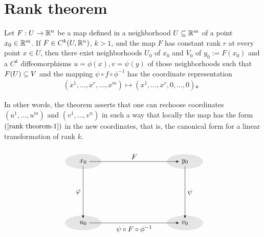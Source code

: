 \section{Rank theorem}
\begin{theorem}\label{rank theorem}
Let $F:U\to\mathbb{R}^n$ be a map defined in a neighborhood $U\subseteq\mathbb{R}^m$ of a point $x_0\in\mathbb{R}^m$. If $F\in C^k(U,\mathbb{R}^n)$, $k>1$, and the map $F$ has constant rank $r$ at every point $x\in U$, then there exist neighborhoods $U_0$ of $x_0$ and $V_0$ of $y_0:=F(x_0)$ and a $C^k$ diffeomorphisms $u=\phi(x),v=\psi(y)$ of those neighborhoods such that $F(U)\subseteq V$ and the mapping $\psi\circ f\circ\phi^{-1}$ has the coordinate representation
\begin{align}\label{rank theorem-1}
(x^1,\dots,x^r,\dots,x^m)\mapsto(x^1,\dots,x^r,0,\dots,0)。
\end{align}
\end{theorem}
In other words, the theorem asserts that one can rechoose coordinates $(u^1,\dots,u^m)$ and $(v^1,\dots,v^n)$ in such a way that locally the map has the form $(\ref{rank theorem-1})$ in the new coordinates, that is, the canonical form for a linear transformation of rank $k$.
\[
\raisebox{-\height}[-10pt][110pt]{
\begin{tikzpicture}
\filldraw[gray!20] (0,0) ellipse [x radius=25pt, y radius=10pt];
\filldraw[gray!20] (5,0) ellipse [x radius=25pt, y radius=10pt];
\filldraw[gray!20] (5,3) ellipse [x radius=25pt, y radius=10pt];
\filldraw[gray!20] (0,3) ellipse [x radius=25pt, y radius=10pt];
\node (u) at (0,0) {$u_0$};
\node (v) at (5,0) {$v_0$};
\node (y) at (5,3) {$y_0$};
\node (x) at (0,3) {$x_0$};
\draw[-Stealth]
(x) edge  node[above] {$F$} (y)
(x) edge  node[left] {$\varphi$} (u)
(u) edge  node[below] {$\psi\circ F\circ\phi^{-1}$} (v)
(y) edge  node[right] {$\psi$} (v);
\end{tikzpicture}}
\]
